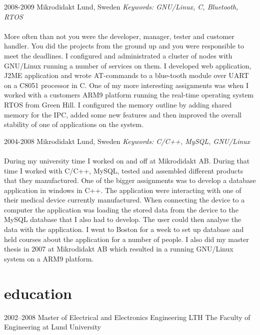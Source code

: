 \documentclass[nocolors]{template/friggeri-cv-a4}
\begin{document}
\begin{entrylist}
\entry
{2008-2009}
{Mikrodidakt}
{Lund, Sweden}
{\emph{Keywords: GNU/Linux, C, Bluetooth, RTOS} \\
\\
More often than not you were the developer, manager, tester and customer handler. You did the projects from the ground up and you were responsible to meet the deadlines. I configured and administrated a cluster of nodes with GNU/Linux running a number of services on them. I developed web application, J2ME application and wrote AT-commands to a blue-tooth module over UART on a C8051 processor in C. One of my more interesting assignments was when I worked with a customers ARM9 platform running the real-time operating system RTOS from Green Hill. I configured the memory outline by adding shared memory for the IPC, added some new features and then improved the overall stability of one of applications on the system.
\\
}


\entry
{2004-2008}
{Mikrodidakt}
{Lund, Sweden}
{\emph{Keywords: C/C++, MySQL, GNU/Linux} \\
\\
During my university time I worked on and off at Mikrodidakt AB. During that time I worked with C/C++, MySQL, tested and assembled different products that they manufactured. One of the bigger assignments was to develop a database application in windows in C++. The application were interacting with one of their medical device currently manufactured. When connecting the device to a computer the application was loading the stored data from the device to the MySQL database that I also had to develop. The user could then analyse the data with the application. I went to Boston for a week to set up database and held courses about the application for a number of people. I also did my master thesis in 2007 at Mikrodidakt AB which resulted in a running GNU/Linux system on a ARM9 platform.
\\
}

\end{entrylist}


\section{education}

\begin{entrylist}


\entry
{2002--2008}
{Master {\normalfont of Electrical and Electronics Engineering}}
{LTH}
{The Faculty of Engineering at Lund University}


\end{entrylist}
\end{document}
